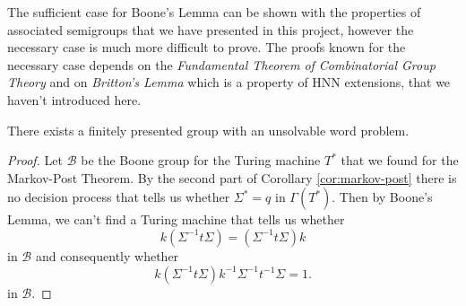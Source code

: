 The sufficient case for Boone's Lemma can be shown with the properties of associated semigroups that we have presented in this project, however the necessary case is much more difficult to prove. The proofs known for the necessary case depends on the \emph{Fundamental Theorem of Combinatorial Group Theory} and on \emph{Britton's Lemma} which is a property of HNN extensions, that we haven't introduced here. 

\begin{theorem}
  \label{thm:finale}
  There exists a finitely presented group with an unsolvable word problem.
\end{theorem}

\begin{proof}
  Let $\mathcal{B}$ be the Boone group for the Turing machine $T^*$ that we found for the Markov-Post Theorem. By the second part of Corollary \ref{cor:markov-post} there is no decision process that tells us whether $\Sigma^* = q$ in $\Gamma(T^*)$. Then by Boone's Lemma, we can't find a Turing machine that tells us whether
  \begin{equation*}
    k(\Sigma^{-1}t\Sigma) = (\Sigma^{-1}t \Sigma)k
  \end{equation*}
  in $\mathcal{B}$ and consequently whether
  \begin{equation*}
    k(\Sigma^{-1}t\Sigma)k^{-1}\Sigma^{-1}t^{-1}\Sigma = 1.
  \end{equation*}
  in $\mathcal{B}$.
\end{proof}


